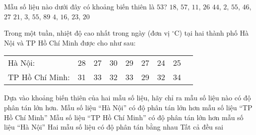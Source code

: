 \begin{ex}%
	Mẫu số liệu nào dưới đây có khoảng biến thiên là $53$?
	\choice
	{$18$, $57$, $11$, $26$}
	{\True $44$, $2$, $55$, $46$, $27$}
	{$21$, $3$, $55$, $89$}
	{$4$, $16$, $23$, $20$}
\end{ex}

\begin{ex}%
	Trong một tuần, nhiệt độ cao nhất trong ngày (đơn vị $^\circ$C) tại hai thành phố Hà Nội và TP Hồ Chí Minh được cho như sau:
	\begin{longtable}{p{3.5cm}p{1cm}p{1cm}p{1cm}p{1cm}p{1cm}p{1cm}p{1cm}p{1cm}}
		Hà Nội: & 28 & 27 & 30 & 29 & 27 & 24 & 25\\
		TP Hồ Chí Minh: & 31 & 33 & 32 & 33 & 29 & 32 & 34\\
	\end{longtable}
	Dựa vào khoảng biến thiên của hai mẫu số liệu, hãy chỉ ra mẫu số liệu nào có độ phân tán lớn hơn.
	\choice
	{\True Mẫu số liệu ``Hà Nội'' có độ phân tán lớn hơn mẫu số liệu ``TP Hồ Chí Minh''}
	{Mẫu số liệu ``TP Hồ Chí Minh'' có độ phân tán lớn hơn mẫu số liệu ``Hà Nội''}
	{Hai mẫu số liệu có độ phân tán bằng nhau}
	{Tất cả đều sai}
\end{ex}

